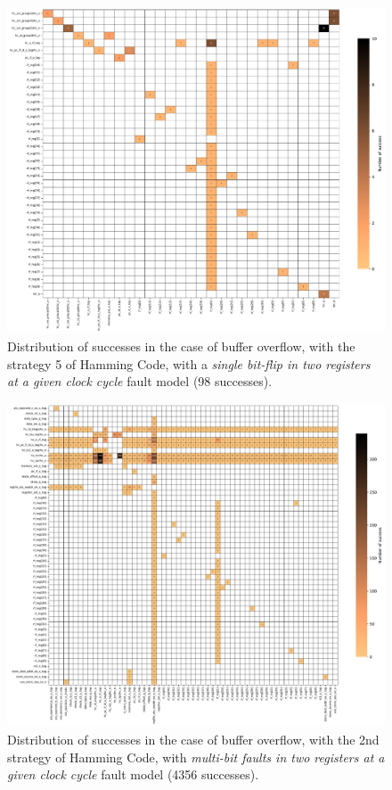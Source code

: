 \begin{figure}[ht]
    \centering
    \includegraphics[width=\textwidth]{c6_group_composition/img/heatmap_buffer_overflow_hamming_5_single_bitflip_spatial_2.pdf}
    \caption{Distribution of successes in the case of buffer overflow, with the strategy 5 of Hamming Code, with a \textit{single bit-flip in two registers at a given clock cycle} fault model (98 successes).}
    \label{fig:heatmap_bo_spatial_hc5}
\end{figure}

\begin{figure}[ht]
    \centering
    \includegraphics[width=.97\textwidth]{c6_group_composition/img/heatmap_buffer_overflow_hamming_2_multi_bitflip_reg_multi_2.pdf}
    \caption{Distribution of successes in the case of buffer overflow, with the 2nd strategy of Hamming Code, with \textit{multi-bit faults in two registers at a given clock cycle} fault model (4356 successes).}
    \label{fig:heatmap_bo_multireg_hc2}
\end{figure}

